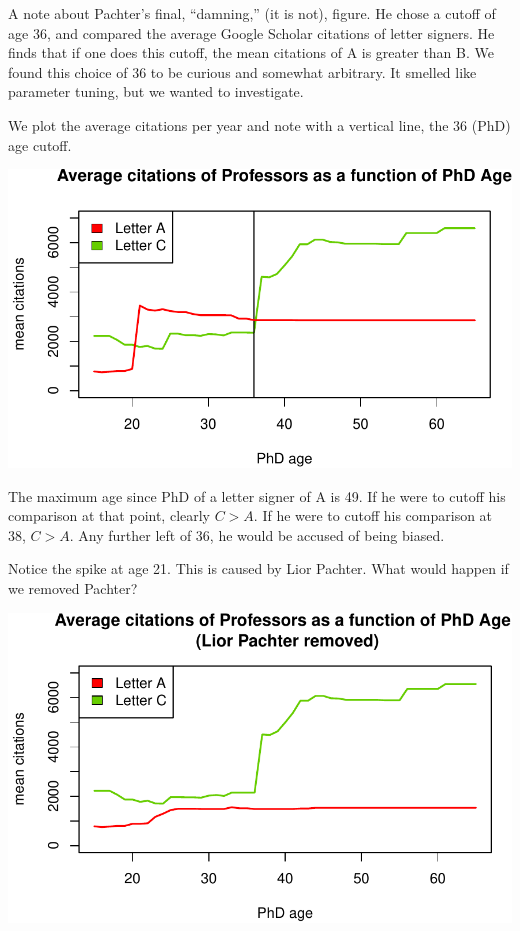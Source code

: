 \documentclass[]{article}
\begin{document}
A note about Pachter's final, ``damning,'' (it is not), figure. He chose
a cutoff of age 36, and compared the average Google Scholar citations of
letter signers. He finds that if one does this cutoff, the mean
citations of A is greater than B. We found this choice of 36 to be
curious and somewhat arbitrary. It smelled like parameter tuning, but we
wanted to investigate.

We plot the average citations per year and note with a vertical line,
the 36 (PhD) age cutoff.

\includegraphics{index_files/figure-latex/unnamed-chunk-42-1.pdf}

The maximum age since PhD of a letter signer of A is 49. If he were to
cutoff his comparison at that point, clearly \(C>A\). If he were to
cutoff his comparison at 38, \(C>A\). Any further left of 36, he would
be accused of being biased.

Notice the spike at age 21. This is caused by Lior Pachter. What would
happen if we removed Pachter?

\includegraphics{index_files/figure-latex/unnamed-chunk-44-1.pdf}
\end{document}
